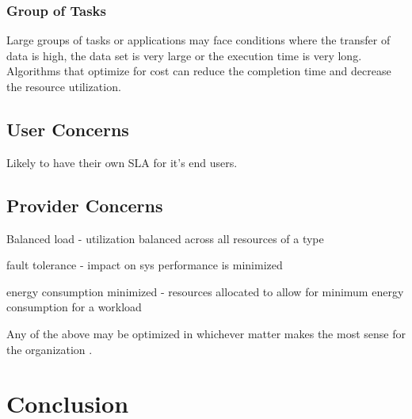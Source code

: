 \documentclass[fullapage,12pt]{article}
\begin{document}
\subsubsection*{Group of Tasks}

Large groups of tasks or applications may face conditions where the transfer of data is high, the data set is very large or the execution time is very long. Algorithms that optimize for cost can reduce the completion time and decrease the resource utilization.


\subsection{User Concerns}

\cite{Jennings2015}
Likely to have their own SLA for it's end users.


\subsection{Provider Concerns} \label{provider-concerns}



Balanced load - utilization balanced across all resources of a type

fault tolerance - impact on sys performance is minimized

energy consumption minimized - resources allocated to allow for minimum energy consumption for a workload

Any of the above may be optimized in whichever matter makes the most sense for the organization \cite{Jennings2015}.




\section{Conclusion} \label{sec:conclusion}


\printbibliography
\end{document}
